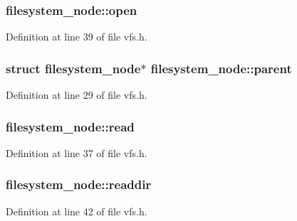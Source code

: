 \hypertarget{structfilesystem__node_a3c2d29f74f04c0f194103842a433cd71}{
\subsubsection[{open}]{ {\bf filesystem\_\-node::open}}}
\label{structfilesystem__node_a3c2d29f74f04c0f194103842a433cd71}


Definition at line 39 of file vfs.h.

\hypertarget{structfilesystem__node_ab3018c8aaf8bafd7a2c85f467887d3d3}{
\subsubsection[{parent}]{\setlength{\rightskip}{0pt plus 5cm}struct {\bf filesystem\_\-node}$\ast$ {\bf filesystem\_\-node::parent}}}
\label{structfilesystem__node_ab3018c8aaf8bafd7a2c85f467887d3d3}


Definition at line 29 of file vfs.h.

\hypertarget{structfilesystem__node_a085044cdf553849d4b6719c13242c565}{
\subsubsection[{read}]{ {\bf filesystem\_\-node::read}}}
\label{structfilesystem__node_a085044cdf553849d4b6719c13242c565}


Definition at line 37 of file vfs.h.

\hypertarget{structfilesystem__node_aa0897739cc3714c617920250c743f8c4}{
\subsubsection[{readdir}]{ {\bf filesystem\_\-node::readdir}}}
\label{structfilesystem__node_aa0897739cc3714c617920250c743f8c4}


Definition at line 42 of file vfs.h.

